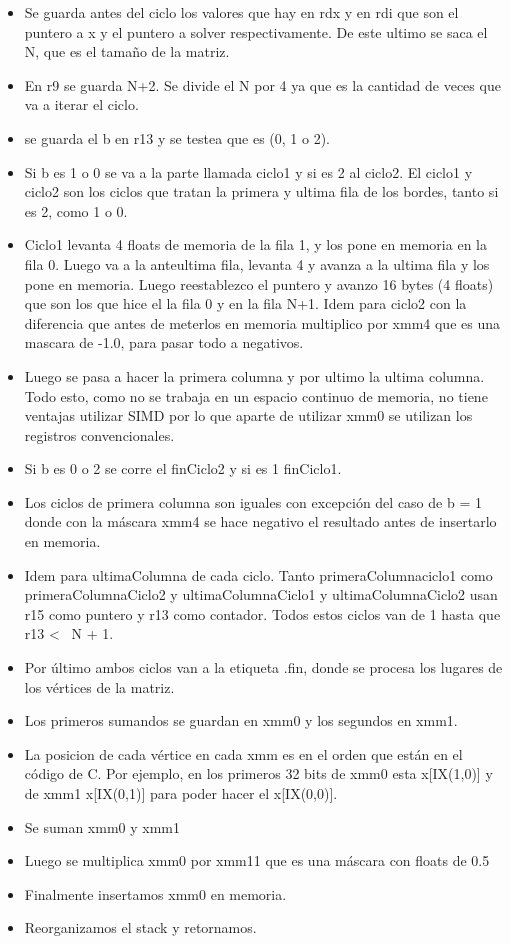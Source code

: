\begin{itemize}
\item Se guarda antes del ciclo los valores que hay en rdx y en rdi que son el puntero a x y el puntero a solver respectivamente. De este ultimo se saca el N, que es el tamaño de la matriz.
\item En r9 se guarda N+2. Se divide el N por 4 ya que es la cantidad de veces que va a iterar el ciclo.
\item se guarda el b en r13 y se testea que es (0, 1 o 2).
\item Si b es 1 o 0 se va a la parte llamada ciclo1 y si es 2 al ciclo2. El ciclo1 y ciclo2 son los ciclos que tratan la primera y ultima fila de los bordes, tanto si es 2, como 1 o 0.
\item Ciclo1 levanta 4 floats de memoria de la fila 1, y los pone en memoria en la fila 0. Luego va a la anteultima fila, levanta 4 y avanza a la ultima fila y los pone en memoria. Luego reestablezco el puntero y avanzo 16 bytes (4 floats) que son los que hice el la fila 0 y en la fila N+1. Idem para ciclo2 con la diferencia que antes de meterlos en memoria multiplico por xmm4 que es una mascara de -1.0, para pasar todo a negativos.
\item Luego se pasa a hacer la primera columna y por ultimo la ultima columna. Todo esto, como no se trabaja en un espacio continuo de memoria, no tiene ventajas utilizar SIMD por lo que aparte de utilizar xmm0 se utilizan los registros convencionales.
\item Si b es 0 o 2 se corre el finCiclo2 y si es 1 finCiclo1.
\item Los ciclos de primera columna son iguales con excepción del caso de b = 1 donde con la máscara xmm4 se hace negativo el resultado antes de insertarlo en memoria.
\item Idem para ultimaColumna de cada ciclo. Tanto primeraColumnaciclo1 como primeraColumnaCiclo2 y ultimaColumnaCiclo1 y ultimaColumnaCiclo2 usan r15 como puntero y r13 como contador. Todos estos ciclos van de 1 hasta que r13 < \ N + 1.
\item Por último ambos ciclos van a la etiqueta .fin, donde se procesa los lugares de los vértices de la matriz.
\item Los primeros sumandos se guardan en xmm0 y los segundos en xmm1.
\item La posicion de cada vértice en cada xmm es en el orden que están en el código de C. Por ejemplo, en los primeros 32 bits de xmm0 esta x[IX(1,0)] y de xmm1 x[IX(0,1)] para poder hacer el x[IX(0,0)].

\item Se suman xmm0 y xmm1

\item Luego se multiplica xmm0 por xmm11 que es una máscara con floats de 0.5

\item Finalmente insertamos xmm0 en memoria.

\item Reorganizamos el stack y retornamos.

\end{itemize}

